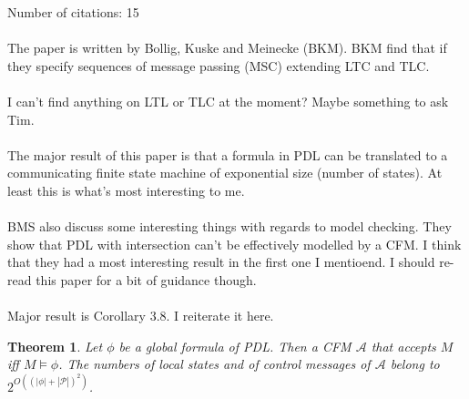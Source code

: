 \documentclass[10pt, a4paper, twoside]{article}
\newtheorem{thm}{Theorem}
\begin{document}
Number of citations: 15\\
\\
The paper is written by Bollig, Kuske and Meinecke (BKM).
BKM find that if they specify sequences of message passing (MSC) extending LTC
and TLC.\\
\\
I can't find anything on LTL or TLC at the moment?
Maybe something to ask Tim.\\
\\
The major result of this paper is that a formula in PDL can be translated to a
communicating finite state machine of exponential size (number of states).
At least this is what's most interesting to me.\\
\\
BMS also discuss some interesting things with regards to model checking.
They show that PDL with intersection can't be effectively modelled by a CFM.
I think that they had a most interesting result in the first one I mentioend.
I should re-read this paper for a bit of guidance though.\\
\\
Major result is Corollary 3.8.
I reiterate it here.
\begin{thm}
	Let $\phi$ be a global formula of PDL.
	Then a CFM $\mathcal{A}$ that accepts $M$ iff $M \models \phi$.
	The numbers of local states and of control messages of $\mathcal{A}$ belong to
	$2^{O((|\phi|+|\mathcal{P}|)^2)}$.
\end{thm}
\end{document}
